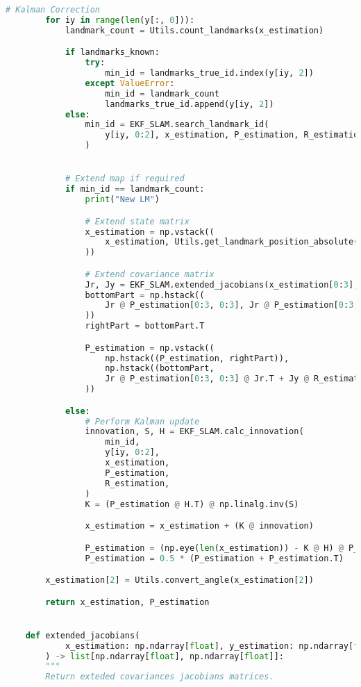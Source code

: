 \documentclass[../CSC_5RO12_TA_TP4.tex]{subfiles}
\begin{document}
\begin{scriptsize}
\begin{lstlisting}[language=Python]
        # Kalman Correction
        for iy in range(len(y[:, 0])):
            landmark_count = Utils.count_landmarks(x_estimation)

            if landmarks_known:
                try:
                    min_id = landmarks_true_id.index(y[iy, 2])
                except ValueError:
                    min_id = landmark_count
                    landmarks_true_id.append(y[iy, 2])
            else:
                min_id = EKF_SLAM.search_landmark_id(
                    y[iy, 0:2], x_estimation, P_estimation, R_estimation
                )


            # Extend map if required
            if min_id == landmark_count:
                print("New LM")

                # Extend state matrix
                x_estimation = np.vstack((
                    x_estimation, Utils.get_landmark_position_absolute(x_estimation, y[iy, :])
                ))

                # Extend covariance matrix
                Jr, Jy = EKF_SLAM.extended_jacobians(x_estimation[0:3], y[iy, :])
                bottomPart = np.hstack((
                    Jr @ P_estimation[0:3, 0:3], Jr @ P_estimation[0:3, 3:]
                ))
                rightPart = bottomPart.T

                P_estimation = np.vstack((
                    np.hstack((P_estimation, rightPart)),
                    np.hstack((bottomPart,
                    Jr @ P_estimation[0:3, 0:3] @ Jr.T + Jy @ R_estimation @ Jy.T))
                ))

            else:
                # Perform Kalman update
                innovation, S, H = EKF_SLAM.calc_innovation(
                    min_id,
                    y[iy, 0:2],
                    x_estimation,
                    P_estimation,
                    R_estimation,
                )
                K = (P_estimation @ H.T) @ np.linalg.inv(S)

                x_estimation = x_estimation + (K @ innovation)

                P_estimation = (np.eye(len(x_estimation)) - K @ H) @ P_estimation
                P_estimation = 0.5 * (P_estimation + P_estimation.T)    # symetry matrix

        x_estimation[2] = Utils.convert_angle(x_estimation[2])

        return x_estimation, P_estimation


    def extended_jacobians(
            x_estimation: np.ndarray[float], y_estimation: np.ndarray[float]
        ) -> list[np.ndarray[float], np.ndarray[float]]:
        """
        Return exteded covariances jacobians matrices.


\end{lstlisting}
\end{scriptsize}
\end{document}
